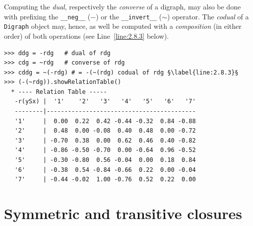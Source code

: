 Computing the \emph{dual}, respectively the \emph{converse} of a digraph, may also be done with prefixing the \texttt{\_\_neg\_\_} ($-$) or the \texttt{\_\_invert\_\_} ($\sim$) operator. The \emph{codual} of a \texttt{Digraph} object may, hence, as well be computed with a \emph{composition} (in either order) of both operations (see Line~\ref{line:2.8.3} below).
\begin{lstlisting}[caption={Computing the dual, the converse and the codual of a digraph},label=list:2.8]
>>> ddg = -rdg   # dual of rdg
>>> cdg = ~rdg   # converse of rdg
>>> cddg = ~(-rdg) # = -(~(rdg) codual of rdg §\label{line:2.8.3}§
>>> (-(~rdg)).showRelationTable()
  * ---- Relation Table -----
   -r(ySx) |  '1'    '2'   '3'   '4'   '5'   '6'   '7'	    
   --------|------------------------------------------
   '1'     |  0.00  0.22  0.42 -0.44 -0.32  0.84 -0.88	 
   '2'     |  0.48  0.00 -0.08  0.40  0.48  0.00 -0.72	 
   '3'     | -0.70  0.38  0.00  0.62  0.46  0.40 -0.82	 
   '4'     | -0.86 -0.50 -0.70  0.00 -0.64  0.96 -0.52	 
   '5'     | -0.30 -0.80  0.56 -0.04  0.00  0.18  0.84	 
   '6'     | -0.38  0.54 -0.84 -0.66  0.22  0.00 -0.04	 
   '7'     | -0.44 -0.02  1.00 -0.76  0.52  0.22  0.00	 
\end{lstlisting}
  
\section{Symmetric and transitive closures}
\label{sec:2.7}


